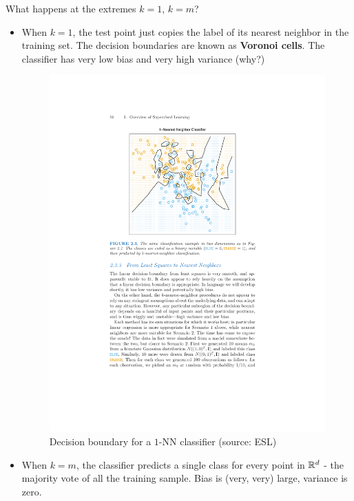 \documentclass[11pt]{article}
\begin{document}
What happens at the extremes $k=1$, $k=m$?
\begin{itemize}
  \item 
    When $k=1$, the test point just copies the label of its nearest neighbor in the
training set. The decision boundaries are known as {\bf Voronoi cells}. The
classifier has very low bias and very high variance (why?)

\begin{figure}[h!]
  \centering
  \includegraphics{esl_1_nn.pdf}
  \caption{Decision boundary for a $1$-NN classifier (source: ESL)}
\end{figure}

\item When $k=m$, the classifier predicts a single class for every point in
  $\mathbb{R}^d$ - the majority vote of all the training sample. Bias is (very,
  very) large, variance is zero. 
\end{itemize}
\end{document}
